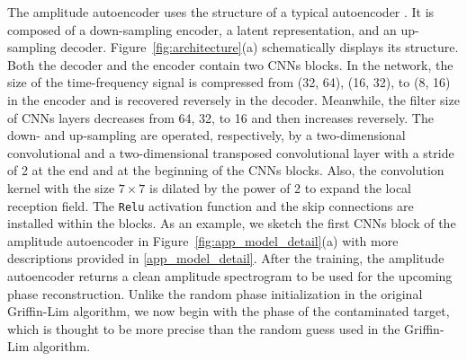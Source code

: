 \documentclass[preprint,12pt]{elsarticle}
\begin{document}
The amplitude autoencoder uses the structure of a typical autoencoder \cite{kramer1991nonlinear}. 
It is composed of a down-sampling encoder, a latent representation, and an up-sampling decoder. 
Figure~\ref{fig:architecture}(a) schematically displays its structure. 
Both the decoder and the encoder contain two CNNs blocks. 
In the network, the size of the time-frequency signal is compressed from (32, 64), (16, 32), to (8, 16) in the encoder and is recovered reversely in the decoder.
Meanwhile, the filter size of CNNs layers decreases from 64, 32, to 16 and then increases reversely. 
The down- and up-sampling are operated, respectively, by a two-dimensional convolutional and a two-dimensional transposed convolutional layer with a stride of 2 at the end and at the beginning of the CNNs blocks. 
Also, the convolution kernel with the size $7\times 7$ is dilated by the power of 2 to expand the local reception field. 
The {\tt Relu} activation function \cite{agarap2019deep} and the skip connections are installed within the blocks.
As an example, we sketch the first CNNs block of the amplitude autoencoder in Figure~\ref{fig:app_model_detail}(a) with more descriptions provided in \ref{app_model_detail}.
After the training, the amplitude autoencoder returns a clean amplitude spectrogram to be used for the upcoming phase reconstruction. 
Unlike the random phase initialization in the original Griffin-Lim algorithm, we now begin with the phase of the contaminated target, which is thought to be more precise than the random guess used in the Griffin-Lim algorithm.
\end{document}
